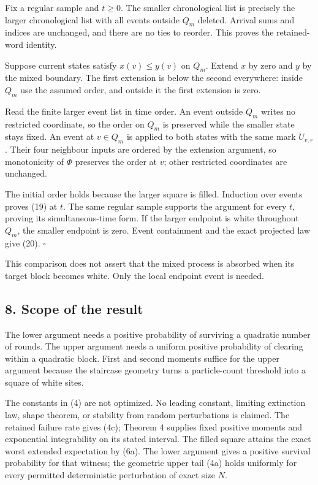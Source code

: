\documentclass[
  11pt,
  a4paper,
]{article}
\begin{document}
Fix a regular sample and \(t\geq0\). The smaller chronological list is
precisely the larger chronological list with all events outside \(Q_m\)
deleted. Arrival sums and indices are unchanged, and there are no ties
to reorder. This proves the retained-word identity.

Suppose current states satisfy \(x(v)\leq y(v)\) on \(Q_m\). Extend
\(x\) by zero and \(y\) by the mixed boundary. The first extension is
below the second everywhere: inside \(Q_m\) use the assumed order, and
outside it the first extension is zero.

Read the finite larger event list in time order. An event outside
\(Q_m\) writes no restricted coordinate, so the order on \(Q_m\) is
preserved while the smaller state stays fixed. An event at \(v\in Q_m\)
is applied to both states with the same mark \(U_{v,r}\). Their four
neighbour inputs are ordered by the extension argument, so monotonicity
of \(\Phi\) preserves the order at \(v\); other restricted coordinates
are unchanged.

The initial order holds because the larger square is filled. Induction
over events proves (19) at \(t\). The same regular sample supports the
argument for every \(t\), proving its simultaneous-time form. If the
larger endpoint is white throughout \(Q_m\), the smaller endpoint is
zero. Event containment and the exact projected law give (20).
\(\square\)

This comparison does not assert that the mixed process is absorbed when
its target block becomes white. Only the local endpoint event is needed.

\subsection{8. Scope of the result}\label{scope-of-the-result}

The lower argument needs a positive probability of surviving a quadratic
number of rounds. The upper argument needs a uniform positive
probability of clearing within a quadratic block. First and second
moments suffice for the upper argument because the staircase geometry
turns a particle-count threshold into a square of white sites.

The constants in (4) are not optimized. No leading constant, limiting
extinction law, shape theorem, or stability from random perturbations is
claimed. The retained failure rate gives (4c); Theorem 4 supplies fixed
positive moments and exponential integrability on its stated interval.
The filled square attains the exact worst extended expectation by (6a).
The lower argument gives a positive survival probability for that
witness; the geometric upper tail (4a) holds uniformly for every
permitted deterministic perturbation of exact size \(N\).
\end{document}
